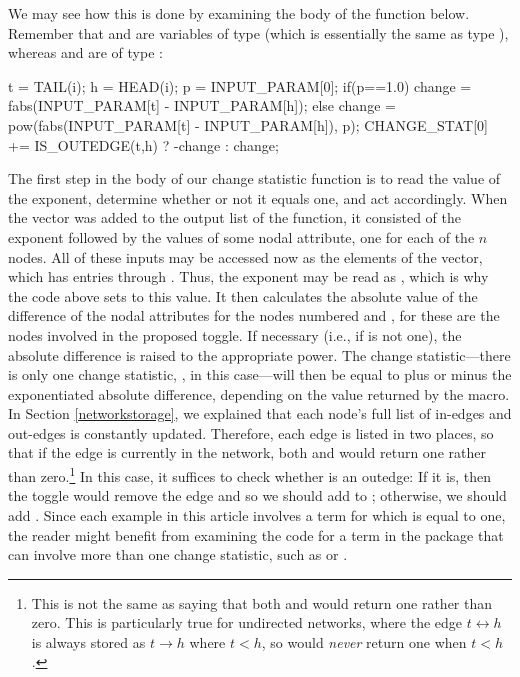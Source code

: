 \documentclass[nojss]{jss}
\begin{document}
We may see how this is done by examining the body of the  function below.
Remember that  and  are variables of type  (which is essentially
the same as type ), whereas  and  are of type
:
\begin{CodeChunk}
\begin{CodeInput}
    t = TAIL(i); h = HEAD(i);
    p = INPUT_PARAM[0];
    if(p==1.0){
      change = fabs(INPUT_PARAM[t] - INPUT_PARAM[h]);
    }else{
      change = pow(fabs(INPUT_PARAM[t] - INPUT_PARAM[h]), p);
    }
    CHANGE_STAT[0] += IS_OUTEDGE(t,h) ? -change : change;
\end{CodeInput}
\end{CodeChunk}
The first step in the body of our change statistic function is to read the value of
the exponent, determine whether or not it equals one, and act
accordingly.  
When the  vector was added to the output list of the
 function, it consisted of the exponent
followed by the values of some nodal attribute, one
for each of the $n$ nodes.  All of these inputs may be accessed now as the
elements of the  vector, which has entries
 through .
Thus, the exponent may be read as
, which is why the code above sets  to this value.
It then calculates the absolute value of the
difference of the nodal attributes for the nodes numbered  and ,
for these are the nodes involved in the proposed toggle.  If necessary (i.e.,
if  is not one),
the absolute difference is raised to the appropriate power.
The change statistic---there is only one change statistic,
, in this case---will then be equal to plus or minus
the exponentiated absolute difference, depending on the value
returned by the  macro.  In Section \ref{networkstorage},
we explained that each node's full list of in-edges and out-edges is constantly
updated.  Therefore, each edge is listed in two places, so that if the
edge  is currently in the network, both
 and  would return one
rather than zero.\footnote{This is not the same as saying that
both  and  would return one rather than zero.  This is particularly true for undirected networks, where the edge
$t\!\longleftrightarrow\!h$ is always stored as
$t\!\longrightarrow\!h$ where $t<h$, so
 would {\em never} return one when $t<h$.}
In this case, it suffices to check whether  is
an outedge:  If it is, then the toggle would remove the edge and so
we should add  to ; otherwise,
we should add .  Since each example in this
article involves a term for which 
 is equal to one, the reader might 
benefit from examining the 
code for a term in the  package that can involve
more than one change statistic, such as 
 or .
\end{document}
